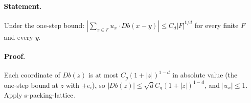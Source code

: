 \paragraph{Statement.} Under the one-step bound: $|\sum_{x\in F}u_x\cdot Db(x-y)|\leq C_d|F|^{1/d}$ for every finite $F$ and every $y$.
\paragraph{Proof.} Each coordinate of $Db(z)$ is at most $C_g(1+|z|)^{1-d}$ in absolute value (the one-step bound at $z$ with $\pm e_i$), so
$|Db(z)|\leq\sqrt dC_g(1+|z|)^{1-d}$, and $|u_x|\leq1$. Apply s-packing-lattice.

